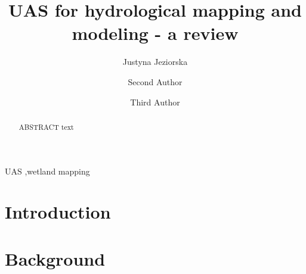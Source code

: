 \documentclass[final,3p,times,twocolumn]{elsarticle}
\begin{document}
\begin{frontmatter}

\title{UAS for hydrological mapping and modeling - a review}

\author[cga]{Justyna Jeziorska}

\author[cga,meas]{Second Author}

\author[cga]{Third Author}


\address[cga]{Center for Geospatial Analytics, North Carolina State University, Raleigh, North Carolina, United States of America}
\address[meas]{Department of Marine, Earth, and Atmospheric Sciences, North Carolina State University, Raleigh, North Carolina, United States of America}


\begin{abstract}
ABSTRACT text
\end{abstract}

\begin{keyword}
UAS \sep wetland mapping 
\end{keyword}

\end{frontmatter}

\tableofcontents
\vfil
\pagebreak

\section{Introduction}


\section{Background} \label{background}
\end{document}
